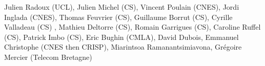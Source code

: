 Julien Radoux (UCL), Julien Michel (CS), Vincent Poulain (CNES), Jordi Inglada (CNES), Thomas Feuvrier (CS), Guillaume Borrut (CS), Cyrille Valladeau (CS) , Mathieu Deltorre (CS), Romain Garrigues (CS), Caroline Ruffel (CS), Patrick Imbo (CS), Eric Bughin (CMLA), David Dubois, Emmanuel Christophe (CNES then CRISP), Miarintsoa Ramanantsimiavona, Gr\'egoire Mercier (Telecom Bretagne)